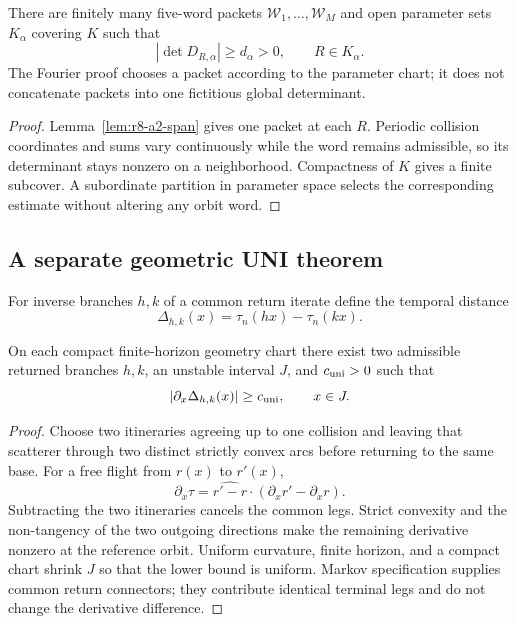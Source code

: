 \begin{theorem}
\label{thm:r8-a2-certificates}
There are finitely many five-word packets $\mathcal W_1,\ldots,\mathcal W_M$
and open parameter sets $K_\alpha$ covering $K$ such that
\[
 |\det D_{R,\alpha}|\ge d_\alpha>0,
 \qquad R\in K_\alpha.
\]
The Fourier proof chooses a packet according to the parameter chart; it does
not concatenate packets into one fictitious global determinant.
\end{theorem}

\begin{proof}
Lemma~\ref{lem:r8-a2-span} gives one packet at each $R$.  Periodic collision
coordinates and sums vary continuously while the word remains admissible, so
its determinant stays nonzero on a neighborhood.  Compactness of $K$ gives a
finite subcover.  A subordinate partition in parameter space selects the
corresponding estimate without altering any orbit word.
\end{proof}

\subsection{A separate geometric UNI theorem}

For inverse branches $h,k$ of a common return iterate define the temporal
distance
\[
 \Delta_{h,k}(x)=\tau_n(hx)-\tau_n(kx).
\]

\begin{lemma}
\label{lem:r8-a2-uni-geometry}
On each compact finite-horizon geometry chart there exist two admissible
returned branches $h,k$, an unstable interval $J$, and $c_{\rm uni}>0$ such
that
\[
 |\partial_x\Delta_{h,k}(x)|\ge c_{\rm uni},\qquad x\in J.
\]
\end{lemma}

\begin{proof}
Choose two itineraries agreeing up to one collision and leaving that scatterer
through two distinct strictly convex arcs before returning to the same base.
For a free flight from $r(x)$ to $r'(x)$,
\[
 \partial_x\tau=\widehat{r'-r}\cdot(\partial_xr'-\partial_xr).
\]
Subtracting the two itineraries cancels the common legs.  Strict convexity and
the non-tangency of the two outgoing directions make the remaining derivative
nonzero at the reference orbit.  Uniform curvature, finite horizon, and a
compact chart shrink $J$ so that the lower bound is uniform.  Markov
specification supplies common return connectors; they contribute identical
terminal legs and do not change the derivative difference.
\end{proof}

